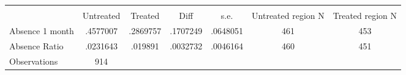 {
\def\sym#1{\ifmmode^{#1}\else\(^{#1}\)\fi}
\begin{tabular}{l*{1}{cccccc}}
\hline\hline
                    &\multicolumn{6}{c}{}                                                         \\
                    &   Untreated&     Treated&        Diff&        s.e.&Untreated region N&Treated region N\\
\hline
Absence 1 month     &    .4577007&    .2869757&    .1707249&    .0648051&         461&         453\\
Absence Ratio       &    .0231643&     .019891&    .0032732&    .0046164&         460&         451\\
\hline
Observations        &         914&            &            &            &            &            \\
\hline\hline
\end{tabular}
}
